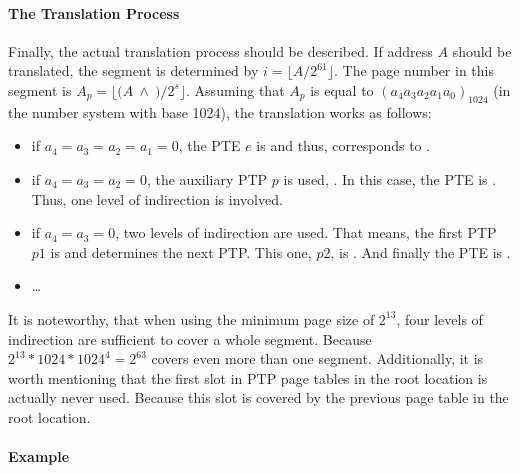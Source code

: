 \paragraph{The Translation Process}

Finally, the actual translation process should be described. If address $A$ should be translated, the segment is determined by $i = \lfloor A / 2^{61} \rfloor$. The page number in this segment is $A_p = \lfloor (A~\land~$$) / 2^s \rfloor$. Assuming that $A_p$ is equal to $(a_4a_3a_2a_1a_0)_{1024}$ (in the number system with base 1024), the translation works as follows:
\begin{itemize}
	\item if $a_4=a_3=a_2=a_1=0$, the PTE $e$ is  and thus,  corresponds to .
	\item if $a_4=a_3=a_2=0$, the auxiliary PTP $p$ is used, \ie {}. In this case, the PTE is . Thus, one level of indirection is involved.
	\item if $a_4=a_3=0$, two levels of indirection are used. That means, the first PTP $p1$ is  and determines the next PTP. This one, $p2$, is . And finally the PTE is .
	\item \dots
\end{itemize}
\citep[pg. 36]{mmix-doc} It is noteworthy, that when using the minimum page size of $2^{13}$, four levels of indirection are sufficient to cover a whole segment. Because $2^{13} * 1024 * 1024^4 = 2^{63}$ covers even more than one segment. Additionally, it is worth mentioning that the first slot in PTP page tables in the root location is actually never used. Because this slot is covered by the previous page table in the root location.

\paragraph{Example}

